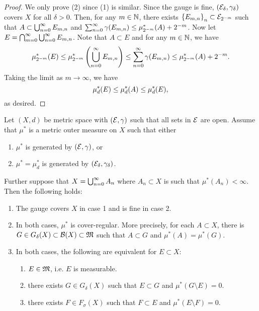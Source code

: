 \documentclass[a4paper]{article}
\begin{document}
\begin{proof}
We only prove (2) since (1) is similar. 
Since the gauge is fine, $(\mathcal{E}_\delta, \gamma_\delta)$
covers $X$ for all $\delta > 0$. Then, for any $m \in \mathbb{N}$,
there exists $\left\{ E_{m, n} \right\}_{n} \subset 
\mathcal{E}_{2^{-m}}$ such that $A \subset \bigcup_{n=0}^\infty E_{m, n}$ 
and $\sum_{n=0}^\infty \gamma(E_{m, n}) \leq \mu^*_{2^{-m}}(A) + 2^{-m}$. 
Now let $E = \bigcap_{m=0}^\infty \bigcup_{n=0}^\infty E_{m, n}$. Note that 
$A \subset E$ and for any $m \in \mathbb{N}$, we have 
\[
\mu^*_{2^{-m}} (E) \leq \mu^*_{2^{-m}} \left( \bigcup_{n=0}^\infty E_{m, n} \right) 
\leq \sum_{n=0}^\infty \gamma(E_{m, n}) \leq \mu^*_{2^{-m}} (A) + 2^{-m}.
\]
Taking the limit as $m \to \infty$, we have 
\[
\mu^*_d (E) \leq \mu^*_d(A) \leq \mu^*_d(E),
\]
as desired.
\end{proof}

\begin{thm}
  Let $(X, d)$ be metric space with $(\mathcal{E}, \gamma)$ such that
  all sets in $\mathcal{E}$ are open. Assume that $\mu^*$ is a metric 
  outer measure on $X$ such that either 
  
  \begin{enumerate}
    \item $\mu^*$ is generated by $(\mathcal{E}, \gamma)$, or 
    \item $\mu^* = \mu^*_d$ is generated by $(\mathcal{E}_\delta, 
    \gamma_\delta)$.
  \end{enumerate}

  Further suppose that $X = \bigcup_{n=0}^\infty A_n$ where $A_n \subset X$
  is such that $\mu^*(A_n) < \infty$. Then the following holds:

  \begin{enumerate}
    \item The gauge covers $X$ in case 1 and is fine in case 
    2. 
    \item In both cases, $\mu^*$ is cover-regular. More precisely,
    for each $A \subset X$, there is $G \in G_\delta(X) \subset \mathcal{B}(X)
    \subset \mathfrak{M}$ such that $A \subset G$ and $\mu^*(A) = \mu^*(G)$.
    \item In both cases, the following are equivalent for 
    $E \subset X$: 
    \begin{enumerate}
      \item $E \in \mathfrak{M}$, i.e. $E$ is measurable.
      \item there exists $G \in G_\delta(X)$ such that 
      $E \subset G$ and $\mu^*(G \setminus E) = 0$.
      \item there exists $F \in F_\sigma(X)$ such that 
      $F \subset E$ and $\mu^* (E \setminus F) = 0$.
    \end{enumerate}
  \end{enumerate}
\end{thm}
\end{document}
